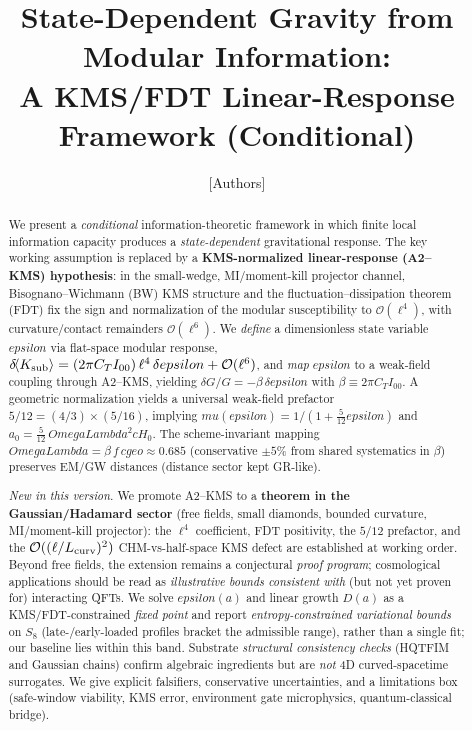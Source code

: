 \documentclass[aps,prd,onecolumn,superscriptaddress,nofootinbib]{revtex4-2}
\def\OmL{OmegaLambda}%
\def\cgeo{cgeo}%
\def\eps{epsilon}%
\def\mu{mu}%
\def\Omega_\Lambda{OmegaLambda}%
\providecommand{\OmL}{\Omega_\Lambda}
\providecommand{\cgeo}{c_{\rm geo}}
\providecommand{\eps}{\varepsilon}
\begin{document}
\title{State-Dependent Gravity from Modular Information:\\
A KMS/FDT Linear-Response Framework (Conditional)}

\author{[Authors]}
\affiliation{[Institutions]}
\date{}

\begin{abstract}
We present a \emph{conditional} information-theoretic framework in which finite local information capacity produces a \emph{state-dependent} gravitational response. The key working assumption is replaced by a \textbf{KMS-normalized linear-response (A2–KMS) hypothesis}: in the small-wedge, MI/moment-kill projector channel, Bisognano–Wichmann (BW) KMS structure and the fluctuation–dissipation theorem (FDT) fix the sign and normalization of the modular susceptibility to $\mathcal O(\ell^4)$, with curvature/contact remainders $\mathcal O(\ell^6)$. We \emph{define} a dimensionless state variable $\eps$ via flat-space modular response, $\delta\!\langle K_{\rm sub}\rangle=(2\pi C_T I_{00})\,\ell^4\,\delta\eps+\mathcal O(\ell^6)$, and \emph{map} $\eps$ to a weak-field coupling through A2–KMS, yielding $\delta G/G=-\beta\,\delta\eps$ with $\beta\equiv 2\pi C_T I_{00}$. A geometric normalization yields a universal weak-field prefactor $5/12=(4/3)\times(5/16)$, implying $\mu(\eps)=1/(1+\tfrac{5}{12}\eps)$ and $a_0=\tfrac{5}{12}\,\OmL^2 cH_0$. The scheme-invariant mapping $\OmL=\beta\,f\,\cgeo\approx 0.685$ (conservative $\pm 5\%$ from shared systematics in $\beta$) preserves EM/GW distances (distance sector kept GR-like).

\emph{New in this version.} We promote A2–KMS to a \textbf{theorem in the Gaussian/Hadamard sector} (free fields, small diamonds, bounded curvature, MI/moment-kill projector): the $\ell^4$ coefficient, FDT positivity, the $5/12$ prefactor, and the $\mathcal O((\ell/L_{\rm curv})^2)$ CHM-vs-half-space KMS defect are established at working order. Beyond free fields, the extension remains a conjectural \emph{proof program}; cosmological applications should be read as \emph{illustrative bounds consistent with} (but not yet proven for) interacting QFTs.
We solve $\eps(a)$ and linear growth $D(a)$ as a KMS/FDT-constrained \emph{fixed point} and report \emph{entropy-constrained variational bounds} on $S_8$ (late-/early-loaded profiles bracket the admissible range), rather than a single fit; our baseline lies within this band. Substrate \emph{structural consistency checks} (HQTFIM and Gaussian chains) confirm algebraic ingredients but are \emph{not} 4D curved-spacetime surrogates. We give explicit falsifiers, conservative uncertainties, and a limitations box (safe-window viability, KMS error, environment gate microphysics, quantum-classical bridge).
\end{abstract}
\end{document}
